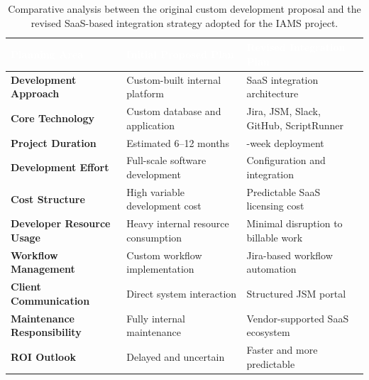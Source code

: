 \documentclass[a4paper,12pt]{article}
\begin{document}
\begin{table}[h]
\centering
\renewcommand{\arraystretch}{1.45}
\small
\begin{tabularx}{\textwidth}{
    >{\bfseries}p{4.2cm}          %
    >{\raggedright\arraybackslash}X  %
    >{\raggedright\arraybackslash}X  %
}
\toprule
\rowcolor{headerbg}
\textcolor{white}{\textbf{Planning Area}} &
\textcolor{white}{\textbf{Initial Proposed Plan}} &
\textcolor{white}{\textbf{Revised Integration Plan}} \\
\midrule

\rowcolor{rowodd}
Development Approach &
Custom-built internal platform &
SaaS integration architecture \\

\rowcolor{roweven}
Core Technology &
Custom database and application &
Jira, JSM, Slack, GitHub, ScriptRunner \\

\rowcolor{rowodd}
Project Duration &
Estimated 6–12 months &
12-week deployment \\

\rowcolor{roweven}
Development Effort &
Full-scale software development &
Configuration and integration \\

\rowcolor{rowodd}
Cost Structure &
High variable development cost &
Predictable SaaS licensing cost \\

\rowcolor{roweven}
Developer Resource Usage &
Heavy internal resource consumption &
Minimal disruption to billable work \\

\rowcolor{rowodd}
Workflow Management &
Custom workflow implementation &
Jira-based workflow automation \\

\rowcolor{roweven}
Client Communication &
Direct system interaction &
Structured JSM portal \\

\rowcolor{rowodd}
Maintenance Responsibility &
Fully internal maintenance &
Vendor-supported SaaS ecosystem \\

\rowcolor{roweven}
ROI Outlook &
Delayed and uncertain &
Faster and more predictable \\

\bottomrule
\end{tabularx}

\caption{Comparative analysis between the original custom development proposal
and the revised SaaS-based integration strategy adopted for the IAMS project.}
\end{table}
\end{document}
